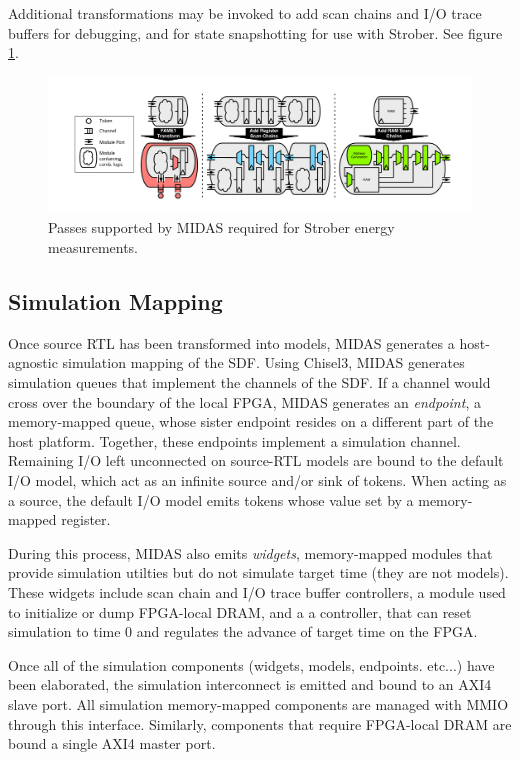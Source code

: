 Additional transformations may be invoked to add scan chains and I/O trace
buffers for debugging, and for state snapshotting for use with
Strober\cite{strober}. See figure \ref{fig:midas-passes}.

\begin{figure}
	\centering
	\includegraphics[width=16cm]{figures/midas-passes.pdf}
	\caption{Passes supported by MIDAS required for Strober energy measurements.}
	\label{fig:midas-passes}
	\centering
\end{figure}

\subsection{Simulation Mapping}

Once source RTL has been transformed into models, MIDAS generates a
host-agnostic simulation mapping of the SDF. Using Chisel3, MIDAS generates
simulation queues that implement the channels of the SDF. If a channel would
cross over the boundary of the local FPGA, MIDAS generates an \emph{endpoint},
a memory-mapped queue, whose sister endpoint resides on a different part of the
host platform.  Together, these endpoints implement a simulation channel.
Remaining I/O left unconnected on source-RTL models are bound to the default
I/O model, which act as an infinite source and/or sink of tokens.  When acting
as a source, the default I/O model emits tokens whose value set by a
memory-mapped register.

During this process, MIDAS also emits \emph{widgets}, memory-mapped modules
that provide simulation utilties but do not simulate target time (they are not
models). These widgets include scan chain and I/O trace buffer controllers, a
module used to initialize or dump FPGA-local DRAM, and a a controller, that can
reset simulation to time 0 and regulates the advance of target time on the
FPGA.

Once all of the simulation components (widgets, models, endpoints. etc...) have
been elaborated, the simulation interconnect is emitted and bound to an AXI4
slave port. All simulation memory-mapped components are managed with MMIO
through this interface. Similarly, components that require FPGA-local DRAM are
bound a single AXI4 master port.

